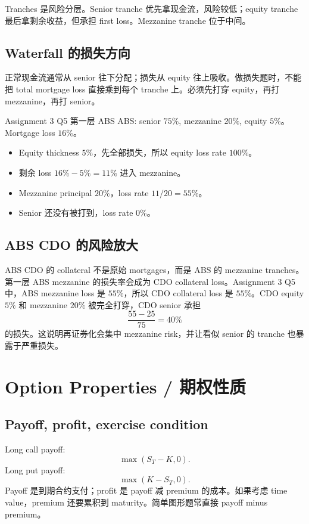 Tranches 是风险分层。Senior tranche 优先拿现金流，风险较低；equity tranche 最后拿剩余收益，但承担 first loss。Mezzanine tranche 位于中间。

\subsection{Waterfall 的损失方向}
正常现金流通常从 senior 往下分配；损失从 equity 往上吸收。做损失题时，不能把 total mortgage loss 直接乘到每个 tranche 上。必须先打穿 equity，再打 mezzanine，再打 senior。

\begin{examplebox}{Assignment 3 Q5 第一层 ABS}
ABS: senior $75\%$, mezzanine $20\%$, equity $5\%$。Mortgage loss $16\%$。
\begin{itemize}
  \item Equity thickness $5\%$，先全部损失，所以 equity loss rate $100\%$。
  \item 剩余 loss $16\%-5\%=11\%$ 进入 mezzanine。
  \item Mezzanine principal $20\%$，loss rate $11/20=55\%$。
  \item Senior 还没有被打到，loss rate $0\%$。
\end{itemize}
\end{examplebox}

\subsection{ABS CDO 的风险放大}
ABS CDO 的 collateral 不是原始 mortgages，而是 ABS 的 mezzanine tranches。第一层 ABS mezzanine 的损失率会成为 CDO collateral loss。Assignment 3 Q5 中，ABS mezzanine loss 是 $55\%$，所以 CDO collateral loss 是 $55\%$。CDO equity $5\%$ 和 mezzanine $20\%$ 被完全打穿，CDO senior 承担
\[
\frac{55-25}{75}=40\%
\]
的损失。这说明再证券化会集中 mezzanine risk，并让看似 senior 的 tranche 也暴露于严重损失。

\section{Option Properties / 期权性质}

\subsection{Payoff, profit, exercise condition}
Long call payoff:
\[
\max(S_T-K,0).
\]
Long put payoff:
\[
\max(K-S_T,0).
\]
Payoff 是到期合约支付；profit 是 payoff 减 premium 的成本。如果考虑 time value，premium 还要累积到 maturity。简单图形题常直接 payoff minus premium。

